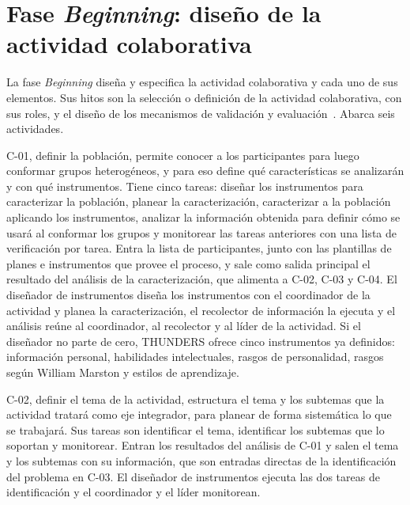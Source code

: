 \documentclass[12pt,letterpaper,oneside]{report}
\begin{document}
\section{Fase \textit{Beginning}: diseño de la actividad colaborativa}
\label{sec:base_beginning}
La fase \textit{Beginning} diseña y especifica la actividad colaborativa y cada
uno de sus elementos. Sus hitos son la selección o definición de la actividad
colaborativa, con sus roles, y el diseño de los mecanismos de validación y
evaluación~\cite{agredo2022thesis}. Abarca seis actividades.

C-01, definir la población, permite conocer a los participantes para luego
conformar grupos heterogéneos, y para eso define qué características se
analizarán y con qué instrumentos. Tiene cinco tareas: diseñar los instrumentos
para caracterizar la población, planear la caracterización, caracterizar a la
población aplicando los instrumentos, analizar la información obtenida para
definir cómo se usará al conformar los grupos y monitorear las tareas
anteriores con una lista de verificación por tarea. Entra la lista de
participantes, junto con las plantillas de planes e instrumentos que provee el
proceso, y sale como salida principal el resultado del análisis de la
caracterización, que alimenta a C-02, C-03 y C-04. El diseñador de instrumentos
diseña los instrumentos con el coordinador de la actividad y planea la
caracterización, el recolector de información la ejecuta y el análisis reúne al
coordinador, al recolector y al líder de la actividad. Si el diseñador no
parte de cero, THUNDERS ofrece cinco instrumentos ya definidos: información
personal, habilidades intelectuales, rasgos de personalidad, rasgos según
William Marston y estilos de aprendizaje.

C-02, definir el tema de la actividad, estructura el tema y los subtemas que la
actividad tratará como eje integrador, para planear de forma sistemática lo
que se trabajará. Sus tareas son identificar el tema, identificar los subtemas
que lo soportan y monitorear. Entran los resultados del análisis de C-01 y
salen el tema y los subtemas con su información, que son entradas directas de la
identificación del problema en C-03. El diseñador de instrumentos ejecuta las
dos tareas de identificación y el coordinador y el líder monitorean.
\end{document}
